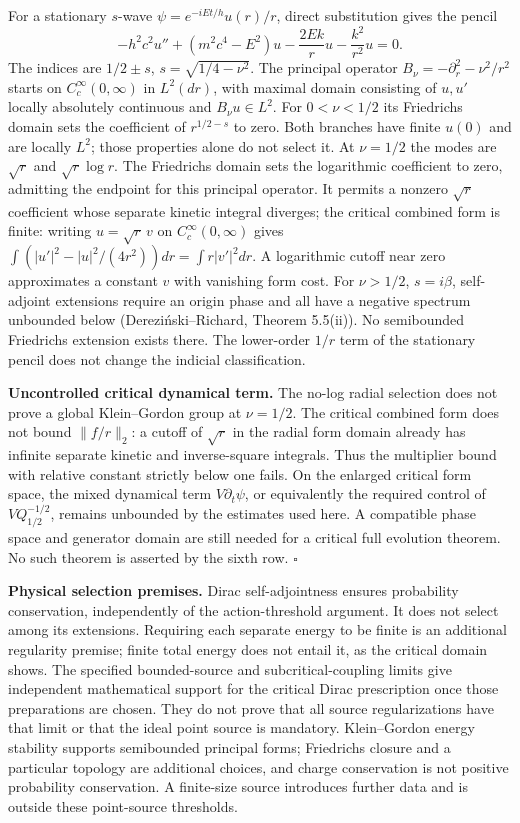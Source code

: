 \documentclass[11pt,a4paper]{article}
\begin{document}
For a stationary \(s\)-wave \(\psi=e^{-iEt/h}u(r)/r\), direct
substitution gives the pencil
\[-h^2c^2u''+(m^2c^4-E^2)u-\frac{2Ek}{r}u-\frac{k^2}{r^2}u=0.\] The
indices are \(1/2\pm s\), \(s=\sqrt{1/4-\nu^2}\). The principal operator
\(B_\nu=-\partial_r^2-\nu^2/r^2\) starts on \(C_c^\infty(0,\infty)\) in
\(L^2(dr)\), with maximal domain consisting of \(u,u'\) locally
absolutely continuous and \(B_\nu u\in L^2\). For \(0<\nu<1/2\) its
Friedrichs domain sets the coefficient of \(r^{1/2-s}\) to zero. Both
branches have finite \(u(0)\) and are locally \(L^2\); those properties
alone do not select it. At \(\nu=1/2\) the modes are \(\sqrt r\) and
\(\sqrt r\log r\). The Friedrichs domain sets the logarithmic
coefficient to zero, admitting the endpoint for this principal operator.
It permits a nonzero \(\sqrt r\) coefficient whose separate kinetic
integral diverges; the critical combined form is finite: writing
\(u=\sqrt r\,v\) on \(C_c^\infty(0,\infty)\) gives
\(\int(|u'|^2-|u|^2/(4r^2))dr=\int r|v'|^2dr\). A logarithmic cutoff
near zero approximates a constant \(v\) with vanishing form cost. For
\(\nu>1/2\), \(s=i\beta\), self-adjoint extensions require an origin
phase and all have a negative spectrum unbounded below
(Dereziński--Richard, Theorem 5.5(ii)). No semibounded Friedrichs
extension exists there. The lower-order \(1/r\) term of the stationary
pencil does not change the indicial classification.

\textbf{Uncontrolled critical dynamical term.} The no-log radial
selection does not prove a global Klein--Gordon group at \(\nu=1/2\).
The critical combined form does not bound \(\|f/r\|_2\): a cutoff of
\(\sqrt r\) in the radial form domain already has infinite separate
kinetic and inverse-square integrals. Thus the multiplier bound with
relative constant strictly below one fails. On the enlarged critical
form space, the mixed dynamical term \(V\partial_t\psi\), or
equivalently the required control of \(VQ_{1/2}^{-1/2}\), remains
unbounded by the estimates used here. A compatible phase space and
generator domain are still needed for a critical full evolution theorem.
No such theorem is asserted by the sixth row. \(\square\)

\textbf{Physical selection premises.} Dirac self-adjointness ensures
probability conservation, independently of the action-threshold
argument. It does not select among its extensions. Requiring each
separate energy to be finite is an additional regularity premise; finite
total energy does not entail it, as the critical domain shows. The
specified bounded-source and subcritical-coupling limits give
independent mathematical support for the critical Dirac prescription
once those preparations are chosen. They do not prove that all source
regularizations have that limit or that the ideal point source is
mandatory. Klein--Gordon energy stability supports semibounded principal
forms; Friedrichs closure and a particular topology are additional
choices, and charge conservation is not positive probability
conservation. A finite-size source introduces further data and is
outside these point-source thresholds.
\end{document}
